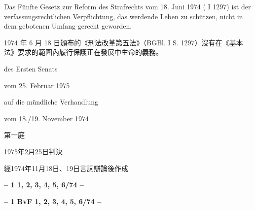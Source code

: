 \documentclass[12pt]{article}
\begin{document}
\syncleft
\begin{sourcepara}
Das Fünfte Gesetz zur Reform des Strafrechts vom 18. Juni 1974 (\abbrBGBl{} I \abbrS{} 1297) ist der verfassungsrechtlichen Verpflichtung, das werdende Leben zu schützen, nicht in dem gebotenen Umfang gerecht geworden.
\end{sourcepara}
\begin{transpara}
1974 年 6 月 18 日頒布的《刑法改革第五法》（BGBl. I S. 1297）沒有在《基本法》要求的範圍內履行保護正在發展中生命的義務。
\end{transpara}

\syncleft
\begin{sourcepara}
{\centering
\small des Ersten Senats\par
\vspace{0.18em}
\normalsize vom 25. Februar 1975\par
\vspace{0.18em}
\footnotesize auf die mündliche Verhandlung\par
vom 18./19. November 1974\par}
\end{sourcepara}
\begin{transpara}
{\centering
\small 第一庭\par
\vspace{0.18em}
\normalsize 1975年2月25日判決\par
\vspace{0.18em}
\footnotesize 經1974年11月18日、19日言詞辯論後作成\par}
\end{transpara}

\syncleft
\begin{sourcepara}
{\centering\bfseries -- 1 \abbrBvF{} 1, 2, 3, 4, 5, 6/74 --\par}
\end{sourcepara}
\begin{transpara}
{\centering\bfseries -- 1 BvF 1, 2, 3, 4, 5, 6/74 --\par}
\end{transpara}
\end{document}

